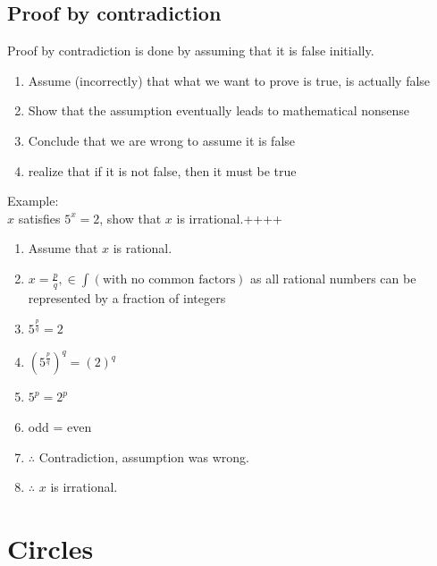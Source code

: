 \documentclass[a4paper,10pt]{report}
\begin{document}
\subsection{Proof by contradiction}
Proof by contradiction is done by assuming that it is false initially.
\begin{enumerate}
	\item Assume (incorrectly) that what we want to prove is true, is actually false
	\item Show that the assumption eventually leads to mathematical nonsense
	\item Conclude that we are wrong to assume it is false
	\item realize that if it is not false, then it must be true
\end{enumerate}
Example:\\
$x$ satisfies $5^x = 2$, show that $x$ is irrational.++++
\begin{enumerate}
	\item Assume that $x$ is rational.
	\item $x = \frac{p}{q}, \in \int (\text{with no common factors})$ as all rational numbers can be represented by a fraction of integers
	\item $5^{\frac{p}{q}} = 2$
	\item $(5^{\frac{p}{q}})^q = (2)^q$
	\item $5^p = 2^p$
	\item odd = even
	\item $\therefore$ Contradiction, assumption was wrong.
	\item $\therefore$ $x$ is irrational.
\end{enumerate}

\section{Circles}
\end{document}
